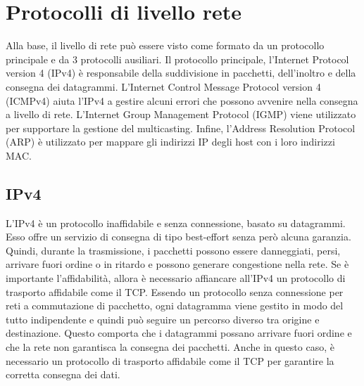 \documentclass[12pt]{report}
\begin{document}
\section{Protocolli di livello rete}
Alla base, il livello di rete può essere visto come formato da un protocollo principale e da 3 protocolli ausiliari. Il protocollo principale, l'Internet Protocol version 4 (IPv4) è responsabile della suddivisione in pacchetti, dell'inoltro e della consegna dei datagrammi. L'Internet Control Message Protocol version 4 (ICMPv4) aiuta l'IPv4 a gestire alcuni errori che possono avvenire nella consegna a livello di rete. L'Internet Group Management Protocol (IGMP) viene utilizzato per supportare la gestione del multicasting. Infine, l'Address Resolution Protocol (ARP) è utilizzato per mappare gli indirizzi IP degli host con i loro indirizzi MAC.

\subsection{IPv4}
L'IPv4 è un protocollo inaffidabile e senza connessione, basato su datagrammi. Esso offre un servizio di consegna di tipo best-effort senza però alcuna garanzia. Quindi, durante la trasmissione, i pacchetti possono essere danneggiati, persi, arrivare fuori ordine o in ritardo e possono generare congestione nella rete. Se è importante l'affidabilità, allora è necessario affiancare all'IPv4 un protocollo di trasporto affidabile come il TCP. Essendo un protocollo senza connessione per reti a commutazione di pacchetto, ogni datagramma viene gestito in modo del tutto indipendente e quindi può seguire un percorso diverso tra origine e destinazione. Questo comporta che i datagrammi possano arrivare fuori ordine e che la rete non garantisca la consegna dei pacchetti. Anche in questo caso, è necessario un protocollo di trasporto affidabile come il TCP per garantire la corretta consegna dei dati.
\end{document}
